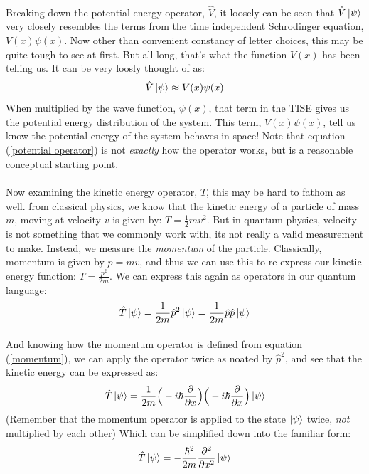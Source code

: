 \documentclass[12pt,letterpaper]{book}
\begin{document}
\paragraph*{}Breaking down the potential energy operator, $\hat{V}$, it loosely can be seen that $\hat{V}\ket{\psi}$ very closely resembles the terms from the time independent Schrodinger equation, $V(x)\psi(x)$. Now other than convenient constancy of letter choices, this may be quite tough to see at first. But all long, that's what the function $V(x)$ has been telling us. It can be very loosly thought of as:
\begin{equation}
\label{potential operator}
\hat{V}\ket{\psi} \approx V(x)\psi(x)
\end{equation}
When multiplied by the wave function, $\psi(x)$, that term in the TISE gives us the potential energy distribution of the system. This term, $V(x)\psi(x)$, tell us know the potential energy of the system behaves in space! Note that equation (\ref{potential operator}) is not \textit{exactly} how the operator works, but is a reasonable conceptual starting point.
\paragraph*{}Now examining the kinetic energy operator, $\hat{T}$, this may be hard to fathom as well. from classical physics, we know that the kinetic energy of a particle of mass $m$, moving at velocity $v$ is given by: $T = \frac{1}{2}mv^2$. But in quantum physics, velocity is not something that we commonly work with, its not really a valid measurement to make. Instead, we measure the \textit{momentum} of the particle. Classically, momentum is given by $p = mv$, and thus we can use this to re-express our kinetic energy function: 
$T = \frac{p^2}{2m}$. We can express this again as operators in our quantum language:
\begin{equation}
\hat{T}\ket{\psi} = \frac{1}{2m}\hat{p}^2 \ket{\psi} = \frac{1}{2m}\hat{p}\hat{p}\ket{\psi}
\end{equation}
\paragraph*{}And knowing how the momentum operator is defined from equation (\ref{momentum}), we can apply the operator twice as noated by 
$\hat{p}^2$, and see that the kinetic energy can be expressed as:
\begin{equation}
\hat{T}\ket{\psi} = \frac{1}{2m} 
\Big( -i\hbar \frac{\partial}{\partial x}\Big) \Big( -i\hbar \frac{\partial}{\partial x} \Big)\ket{\psi}
\end{equation}
(Remember that the momentum operator is applied to the state $\ket{\psi}$ twice, \textit{not} multiplied by each other) Which can be simplified down into the familiar form:
\begin{equation}
\label{kinetic operator}
\hat{T}\ket{\psi} = -\frac{\hbar ^2}{2m} \frac{\partial^2}{\partial x^2}\ket{\psi}
\end{equation}
\end{document}
